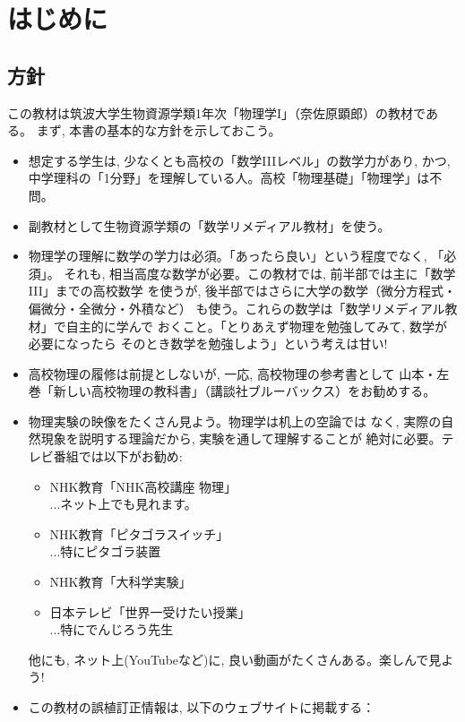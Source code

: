 \chapter{はじめに}


\section{方針}

この教材は筑波大学生物資源学類1年次「物理学I」（奈佐原顕郎）の教材である。
まず, 本書の基本的な方針を示しておこう。

\begin{itemize}
\item 想定する学生は, 少なくとも高校の「数学IIIレベル」の数学力があり, かつ, 
中学理科の「1分野」を理解している人。高校「物理基礎」「物理学」は不問。
\item 副教材として生物資源学類の「数学リメディアル教材」を使う。
\item 物理学の理解に数学の学力は必須。「あったら良い」という程度でなく, 「必須」。
それも, 相当高度な数学が必要。この教材では, 前半部では主に「数学III」までの高校数学
を使うが, 後半部ではさらに大学の数学（微分方程式・偏微分・全微分・外積など）
も使う。これらの数学は「数学リメディアル教材」で自主的に学んで
おくこと。「とりあえず物理を勉強してみて, 数学が必要になったら
そのとき数学を勉強しよう」という考えは甘い!
\item 高校物理の履修は前提としないが, 一応, 高校物理の参考書として
山本・左巻「新しい高校物理の教科書」（講談社ブルーバックス）をお勧めする。
\item 物理実験の映像をたくさん見よう。物理学は机上の空論では
なく, 実際の自然現象を説明する理論だから, 実験を通して理解することが
絶対に必要。テレビ番組では以下がお勧め: 
\begin{itemize}
\item NHK教育「NHK高校講座 物理」\\...ネット上でも見れます。
\item NHK教育「ピタゴラスイッチ」\\...特にピタゴラ装置
\item NHK教育「大科学実験」
\item 日本テレビ「世界一受けたい授業」\\...特にでんじろう先生
\end{itemize}
他にも, ネット上(YouTubeなど)に, 良い動画がたくさんある。楽しんで見よう!
\item この教材の誤植訂正情報は, 以下のウェブサイトに掲載する：\\

\end{itemize}
